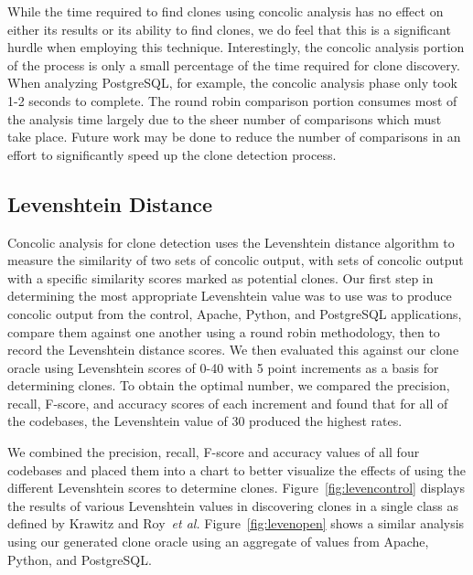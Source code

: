 \documentclass[smallextended]{svjour3}       %
\begin{document}
While the time required to find clones using concolic analysis has no effect on either its results or its ability to find clones, we do feel that this is a significant hurdle when employing this technique. Interestingly, the concolic analysis portion of the process is only a small percentage of the time required for clone discovery. When analyzing PostgreSQL, for example, the concolic analysis phase only took 1-2 seconds to complete. The round robin comparison portion consumes most of the analysis time largely due to the sheer number of comparisons which must take place. Future work may be done to reduce the number of comparisons in an effort to significantly speed up the clone detection process.

\subsection{Levenshtein Distance}

Concolic analysis for clone detection uses the Levenshtein distance algorithm to measure the similarity of two sets of concolic output, with sets of concolic output with a specific similarity scores marked as potential clones. Our first step in determining the most appropriate Levenshtein value was to use was to produce concolic output from the control, Apache, Python, and PostgreSQL applications, compare them against one another using a round robin methodology, then to record the Levenshtein distance scores. We then evaluated this against our clone oracle using Levenshtein scores of 0-40 with 5 point increments as a basis for determining clones. To obtain the optimal number, we compared the precision, recall, F-score, and accuracy scores of each increment and found that for all of the codebases, the Levenshtein value of 30 produced the highest rates.

We combined the precision, recall, F-score and accuracy values of all four codebases and placed them into a chart to better visualize the effects of using the different Levenshtein scores to determine clones. Figure~\ref{fig:levencontrol} displays the results of various Levenshtein values in discovering clones in a single class as defined by Krawitz and Roy~\emph{et al.} Figure~\ref{fig:levenopen} shows a similar analysis using our generated clone oracle using an aggregate of values from Apache, Python, and PostgreSQL.
\end{document}
